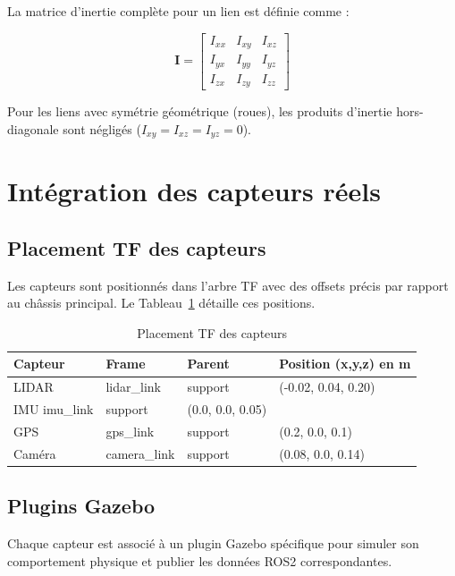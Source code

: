 \documentclass[a4paper,12pt]{report}
\begin{document}
La matrice d'inertie complète pour un lien est définie comme :

\begin{equation}
\mathbf{I} = \begin{bmatrix}
I_{xx} & I_{xy} & I_{xz} \\
I_{yx} & I_{yy} & I_{yz} \\
I_{zx} & I_{zy} & I_{zz}
\end{bmatrix}
\end{equation}

Pour les liens avec symétrie géométrique (roues), les produits d'inertie hors-diagonale sont négligés ($I_{xy} = I_{xz} = I_{yz} = 0$).

\section{Intégration des capteurs réels}

\subsection{Placement TF des capteurs}

Les capteurs sont positionnés dans l'arbre TF avec des offsets précis par rapport au châssis principal. Le Tableau~\ref{tab:sensor_tf} détaille ces positions.

\begin{table}[htbp]
\centering
\caption{Placement TF des capteurs}
\label{tab:sensor_tf}
\begin{tabular}{@{}lllp{5cm}@{}}
\toprule
\textbf{Capteur} & \textbf{Frame} & \textbf{Parent} & \textbf{Position (x,y,z) en m} \\
\midrule
LIDAR & lidar\_link & support & (-0.02, 0.04, 0.20) \\
IMU imu\_link & support & (0.0, 0.0, 0.05) \\
GPS & gps\_link & support & (0.2, 0.0, 0.1) \\
Caméra & camera\_link & support & (0.08, 0.0, 0.14) \\
\bottomrule
\end{tabular}
\end{table}

\subsection{Plugins Gazebo}

Chaque capteur est associé à un plugin Gazebo spécifique pour simuler son comportement physique et publier les données ROS2 correspondantes.
\end{document}
